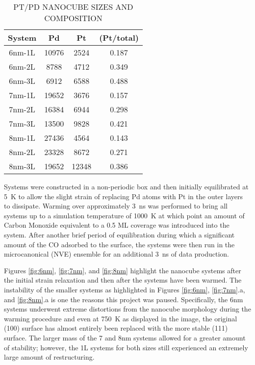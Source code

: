 \begin{table}
  \caption{PT/PD NANOCUBE SIZES AND COMPOSITION}
  \centering
  \begin{threeparttable}
  \begin{tabular}{ c ccc }
  \hline
  \hline
  \textbf{System} & \textbf{Pd} & \textbf{Pt} &  \textbf{(Pt/total)} \\
  \hline
  6nm-1L & 10976 & 2524  & 0.187 \\
  6nm-2L & 8788  & 4712  & 0.349 \\
  6nm-3L & 6912  & 6588  & 0.488 \\
  7nm-1L & 19652 & 3676  & 0.157 \\
  7nm-2L & 16384 & 6944  & 0.298 \\
  7nm-3L & 13500 & 9828  & 0.421 \\
  8nm-1L & 27436 & 4564  & 0.143 \\
  8nm-2L & 23328 & 8672  & 0.271 \\
  8nm-3L & 19652 & 12348 & 0.386 \\
  \hline
  \hline
  \end{tabular}
  \end{threeparttable}
\label{tab:systems}
\end{table}

Systems were constructed in a non-periodic box and then initially equilibrated
at 5~K to allow the slight strain of replacing Pd atoms with Pt in the outer
layers to dissipate. Warming over approximately 3~ns was performed to bring all
systems up to a simulation temperature of 1000~K at which point an amount of
Carbon Monoxide equivalent to a 0.5 ML coverage was introduced into the system.
After another brief period of equilibration during which a significant amount
of the CO adsorbed to the surface, the systems were then run in the
microcanonical (NVE) ensemble for an additional 3~ns of data production.

Figures \ref{fig:6nm}, \ref{fig:7nm}, and \ref{fig:8nm} highlight the nanocube
systems after the initial strain relaxation and then after the systems have
been warmed. The instability of the smaller systems as highlighted in Figures
\ref{fig:6nm}, \ref{fig:7nm}.a, and \ref{fig:8nm}.a is one the reasons this project was paused.
Specifically, the 6nm systems underwent extreme distortions
from the nanocube morphology during the warming procedure and even at 750~K as
displayed in the image, the original (100) surface has almost entirely been
replaced with the more stable (111) surface. The larger mass of the 7 and 8nm
systems allowed for a greater amount of stability; however, the 1L systems for
both sizes still experienced an extremely large amount of restructuring.

